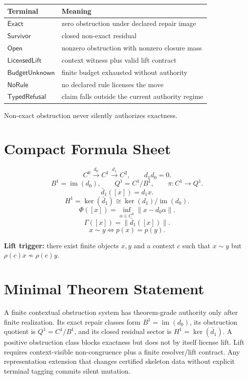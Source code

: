 \documentclass[11pt]{article}
\theoremstyle{definition}
\begin{document}
\begin{center}
\begin{tabular}{ll}
\toprule
Terminal & Meaning \\
\midrule
\(\mathsf{Exact}\) & zero obstruction under declared repair image \\
\(\mathsf{Survivor}\) & closed non-exact residual \\
\(\mathsf{Open}\) & nonzero obstruction with nonzero closure mass \\
\(\mathsf{LicensedLift}\) & context witness plus valid lift contract \\
\(\mathsf{BudgetUnknown}\) & finite budget exhausted without authority \\
\(\mathsf{NoRule}\) & no declared rule licenses the move \\
\(\mathsf{TypedRefusal}\) & claim falls outside the current authority regime \\
\bottomrule
\end{tabular}
\end{center}

Non-exact obstruction never silently authorizes exactness.

\section{Compact Formula Sheet}

\[
C^0\xrightarrow{d_0}C^1\xrightarrow{d_1}C^2,
\qquad d_1d_0=0.
\]
\[
B^1=\operatorname{im}(d_0),
\qquad
Q^1=C^1/B^1,
\qquad
\pi:C^1\to Q^1.
\]
\[
\bar d_1([x])=d_1x.
\]
\[
H^1=\ker(\bar d_1)\cong\ker(d_1)/\operatorname{im}(d_0).
\]
\[
\Phi([x])=\inf_{\alpha\in C^0}\|x-d_0\alpha\|.
\]
\[
\Gamma([x])=\|\bar d_1([x])\|.
\]
\[
x\sim y\iff p(x)=p(y).
\]

\textbf{Lift trigger:} there exist finite objects \(x,y\) and a context \(c\) such that \(x\sim y\) but \(\rho(c)x\not\sim\rho(c)y\).

\section{Minimal Theorem Statement}

A finite contextual obstruction system has theorem-grade authority only after finite realization. Its exact repair classes form \(B^1=\operatorname{im}(d_0)\), its obstruction quotient is \(Q^1=C^1/B^1\), and its closed residual sector is \(H^1=\ker(\bar d_1)\). A positive obstruction class blocks exactness but does not by itself license lift. Lift requires context-visible non-congruence plus a finite resolver/lift contract. Any representation extension that changes certified skeleton data without explicit terminal tagging commits silent mutation.
\end{document}

